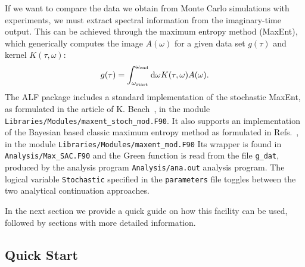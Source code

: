 

If we want to compare the data we obtain from Monte Carlo simulations with experiments, we must extract spectral
 information from the imaginary-time output.
This can be achieved through the maximum entropy method (MaxEnt), which generically computes the  image  $A(\omega) $ 
for a given  data  set $g(\tau) $  and kernel $K(\tau,\omega) $:
\begin{equation}
g(\tau) =  \int_{\omega_\mathrm{start}}^{\omega_\mathrm{end}} \mathrm{d}{\omega} K(\tau,\omega) A(\omega).
\end{equation} 
The  ALF package includes a standard implementation of the stochastic MaxEnt, as formulated in the article of 
K. Beach~\cite{Beach04a}, in the module \texttt{Libraries/Modules/\allowbreak{}maxent\_stoch\_mod.F90}. 
It  also  supports  an  implementation of the  Bayesian  based  classic  maximum entropy  method  as  
formulated  in  Refs.~\cite{Jarrell96,Linden95}, in the 
module \texttt{Libraries/Modules/\allowbreak{}maxent\_mod.F90} 
Its wrapper is found in \texttt{Analysis/Max\_SAC.F90} and the Green function is read from the
file \texttt{g\_dat}, produced  by the  analysis  program   \texttt{Analysis/ana.out} analysis program.
The  logical  variable  \texttt{Stochastic}   specified  in  the  \texttt{parameters} file  toggles between 
the  two  analytical  continuation  approaches.

In the next section we provide a quick guide on how this facility can be used, followed by 
sections with more detailed information.

\subsection{Quick Start}
\label{sec:quick_maxent}

